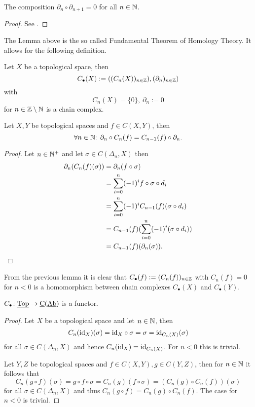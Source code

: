 \begin{lemma}
  The composition $\partial_n \circ \partial_{n+1} = 0$ for all $n \in \mathbb{N}$.
\end{lemma}

\begin{proof}
  See \cite[Theorem 29.1]{MunAlTop}.
\end{proof}

The Lemma above is the so called Fundamental Theorem of Homology Theory. It allows for the following definition.

\begin{defin}
  Let $X$ be a topological space, then \[C_\bullet(X) := ((C_n(X))_{n\in \mathbb{Z}}), (\partial_n)_{n\in \mathbb{Z}})\] with
  \[C_n(X) = \{0\}, \: \partial_n := 0\] for $n \in \mathbb{Z}\setminus\mathbb{N}$ is a chain complex.
\end{defin}

\begin{lemma}
  Let $X, Y$ be topological spaces and $f \in C(X, Y)$, then \[\forall n\in \mathbb{N}\colon \partial_n \circ C_n(f) = C_{n-1}(f) \circ \partial_n.\]
\end{lemma}

\begin{proof}
  Let $n \in \mathbb{N}^+$ and let $\sigma \in C(\Delta_n, X)$ then
  \begin{align*}
    \partial_n(C_n(f)(\sigma)) &= \partial_n(f\circ\sigma) \\
    &= \sum\limits_{i=0}^n(-1)^if\circ\sigma\circ d_i \\
    &= \sum\limits_{i=0}^n(-1)^iC_{n-1}(f)(\sigma\circ d_i) \\
    &= C_{n-1}(f)(\sum\limits_{i=0}^n(-1)^i(\sigma\circ d_i)) \\
    & = C_{n-1}(f)(\partial_n(\sigma)).\qedhere
  \end{align*}
\end{proof}

From the previous lemma it is clear that $C_\bullet(f) := (C_n(f))_{n\in \mathbb{Z}}$ with $C_n(f) = 0$ for $n < 0$ is a homomorphism between chain complexes $C_\bullet(X)$ and $C_\bullet(Y)$.

\begin{lemma}\label{lem:cfunc}
  $C_\bullet\colon \underline{\rm Top} \to \underline{\rm C}(\underline{\rm Ab})$ is a functor.
\end{lemma}

\begin{proof}
  Let $X$ be a topological space and let $n \in \mathbb{N}$, then \[C_n({\rm id}_X)(\sigma) = {\rm id}_X\circ \sigma = \sigma = {\rm id}_{C_n(X)}(\sigma)\]
  for all $\sigma \in C(\Delta_n, X)$ and hence $C_n({\rm id}_X) = {\rm id}_{C_n(X)}$.
  For $n < 0$ this is trivial.

  Let $Y, Z$ be topological spaces and $f \in C(X, Y), g\in C(Y, Z)$, then for $n\in \mathbb{N}$ it follows that \[C_n(g\circ f)(\sigma) = g\circ f \circ \sigma = C_n(g)(f\circ \sigma) = (C_n(g) \circ C_n(f))(\sigma)\] for all $\sigma \in C(\Delta_n, X)$ and thus $C_n(g \circ f) = C_n(g) \circ C_n(f)$.
  The case for $n < 0$ is trivial.
\end{proof}


